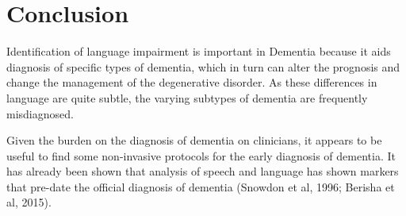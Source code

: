 \documentclass[a4paper]{article}
\begin{document}
\section{Conclusion}
\par
Identification of language impairment is important in Dementia because it aids diagnosis of specific types of dementia, which in turn can alter the prognosis and change the management of the degenerative disorder. As these differences in language are quite subtle, the varying subtypes of dementia are frequently misdiagnosed.
\newline
\par 
Given the burden on the diagnosis of dementia on clinicians, it appears to be useful to find some non-invasive protocols for the early diagnosis of dementia. It has already been shown that analysis of speech and language has shown markers that pre-date the official diagnosis of dementia (Snowdon et al, 1996; Berisha et al, 2015).
\end{document}
